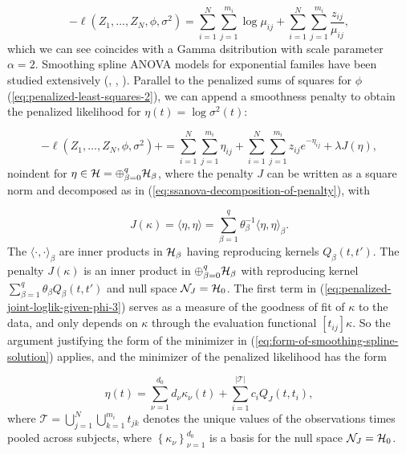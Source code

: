 \documentclass[../chapter-2-spline-representation.tex]{subfiles}
\begin{document}
\begin{equation} \label{eq:penalized-joint-loglik-given-phi-3}
-\ell\left( Z_1,\dots, Z_N, \phi, \sigma^2 \right) =  \sum_{i = 1}^N \sum_{j = 1}^{m_i} \log \mu_{ij}  + \sum_{i = 1}^N \sum_{j = 1}^{m_i} \frac {z_{ij}}{\mu_{ij}},
\end{equation}
\noindent
which we can see coincides with a Gamma dsitribution with scale parameter $\alpha = 2$. Smoothing spline ANOVA models for exponential familes have been studied extensively (\citet{wahba1995smoothing}, \citet{wang1997grkpack}, \citet{gu2013smoothing}). Parallel to the penalized sums of squares for $\phi$ (\ref{eq:penalized-least-squares-2}), we can append a smoothness penalty to obtain the penalized likelihood for $\eta\left(t\right) = \log\sigma^2\left(t\right)$:

\begin{equation} \label{eq:penalized-joint-loglik-given-phi-3}
-\ell\left( Z_1,\dots, Z_N, \phi, \sigma^2 \right) + =  \sum_{i = 1}^N \sum_{j = 1}^{m_i} \eta_{ij}  + \sum_{i = 1}^N \sum_{j = 1}^{m_i} z_{ij} e^{-\eta_{ij}} + \lambda J\left(\eta\right),  
\end{equation}
noindent
for $\eta \in \mathcal{H} = \oplus_{\beta = 0}^q \mathcal{H}_\beta$, where the penalty $J$ can be written as a square norm and decomposed as in (\ref{eq:ssanova-decomposition-of-penalty}), with

\begin{equation*} 
J\left(\kappa \right) = \langle \eta,\eta \rangle = \sum_{\beta = 1}^q \theta_\beta^{-1}\langle \eta,\eta \rangle_{\beta}.
\end{equation*}
\noindent 
The $\langle \cdot, \cdot \rangle_{\beta}$ are inner products in $\mathcal{H}_\beta$ having reproducing kernels $Q_\beta\left(t,t'\right)$. The penalty $J\left(\kappa\right)$ is an inner product in $\oplus_{\beta = 0}^q \mathcal{H}_\beta$ with reproducing kernel $\sum_{\beta=1}^q \theta_\beta Q_\beta\left(t, t'\right)$ and null space $\mathcal{N}_J = \mathcal{H}_0$. The first term in (\ref{eq:penalized-joint-loglik-given-phi-3}) serves as a measure of the goodness of fit of $\kappa$ to the data, and only depends on $\kappa$ through the evaluation functional $\left[t_{ij}\right]\kappa$. So the argument justifying the form of the minimizer in (\ref{eq:form-of-smoothing-spline-solution}) applies, and the minimizer of the penalized likelihood has the form 

\begin{equation} \label{eq:form-of-smoothing-spline-solution-kappa}
\eta\left( t \right) = \sum_{\nu = 1}^{d_0} d_\nu\kappa_\nu\left( t \right) + \sum_{i = 1}^{\vert \mathcal{T} \vert} c_i Q_J\left( t, t_i \right),
\end{equation}  
\noindent
where $\mathcal{T} = \bigcup_{j=1}^N\bigcup_{k=1}^{m_i} t_{jk}$ denotes the unique values of the observations times pooled across subjects, where $\left\{\kappa_\nu \right\}_{\nu=1}^{d_0}$ is a basis for the null space $\mathcal{N}_J = \mathcal{H}_0$. 
\end{document}
